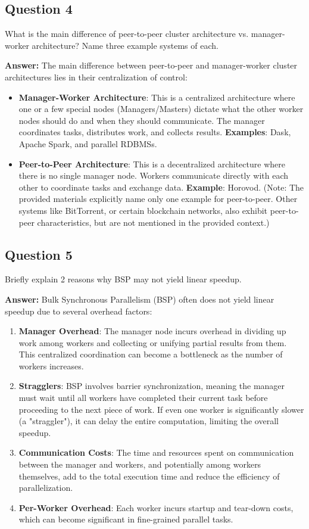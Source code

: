 \documentclass{article}
\begin{document}
\subsection*{Question 4}
What is the main difference of peer-to-peer cluster architecture vs. manager-worker architecture? Name three example systems of each. 

\textbf{Answer:}
The main difference between peer-to-peer and manager-worker cluster architectures lies in their centralization of control:
\begin{itemize}
    \item \textbf{Manager-Worker Architecture}: This is a centralized architecture where one or a few special nodes (Managers/Masters) dictate what the other worker nodes should do and when they should communicate. The manager coordinates tasks, distributes work, and collects results.
        \textbf{Examples}: Dask, Apache Spark, and parallel RDBMSs.
    \item \textbf{Peer-to-Peer Architecture}: This is a decentralized architecture where there is no single manager node. Workers communicate directly with each other to coordinate tasks and exchange data.
        \textbf{Example}: Horovod. (Note: The provided materials explicitly name only one example for peer-to-peer. Other systems like BitTorrent, or certain blockchain networks, also exhibit peer-to-peer characteristics, but are not mentioned in the provided context.)
\end{itemize}

\subsection*{Question 5}
Briefly explain 2 reasons why BSP may not yield linear speedup. 

\textbf{Answer:}
Bulk Synchronous Parallelism (BSP) often does not yield linear speedup due to several overhead factors:
\begin{enumerate}
    \item \textbf{Manager Overhead}: The manager node incurs overhead in dividing up work among workers and collecting or unifying partial results from them. This centralized coordination can become a bottleneck as the number of workers increases.
    \item \textbf{Stragglers}: BSP involves barrier synchronization, meaning the manager must wait until all workers have completed their current task before proceeding to the next piece of work. If even one worker is significantly slower (a "straggler"), it can delay the entire computation, limiting the overall speedup.
    \item \textbf{Communication Costs}: The time and resources spent on communication between the manager and workers, and potentially among workers themselves, add to the total execution time and reduce the efficiency of parallelization.
    \item \textbf{Per-Worker Overhead}: Each worker incurs startup and tear-down costs, which can become significant in fine-grained parallel tasks.
\end{enumerate}
\end{document}
